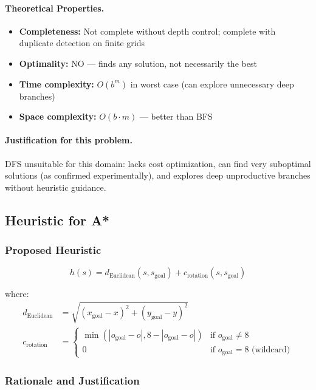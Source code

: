 \documentclass[11pt,a4paper]{article}
\begin{document}
\paragraph{Theoretical Properties.}
\begin{itemize}[leftmargin=1.5cm,itemsep=0.1em]
    \item \textbf{Completeness:} Not complete without depth control; complete with duplicate detection on finite grids
    \item \textbf{Optimality:} NO --- finds any solution, not necessarily the best
    \item \textbf{Time complexity:} $O(b^m)$ in worst case (can explore unnecessary deep branches)
    \item \textbf{Space complexity:} $O(b \cdot m)$ --- better than BFS
\end{itemize}

\paragraph{Justification for this problem.}
DFS unsuitable for this domain: lacks cost optimization, can find very suboptimal solutions (as confirmed experimentally), and explores deep unproductive branches without heuristic guidance.

\subsection{Heuristic for A*}

\subsubsection{Proposed Heuristic}
$$h(s) = d_{\text{Euclidean}}(s, s_{\text{goal}}) + c_{\text{rotation}}(s, s_{\text{goal}})$$

where:
\begin{align*}
d_{\text{Euclidean}} &= \sqrt{(x_{\text{goal}} - x)^2 + (y_{\text{goal}} - y)^2} \\
c_{\text{rotation}} &= \begin{cases}
\min(|o_{\text{goal}} - o|, 8 - |o_{\text{goal}} - o|) & \text{if } o_{\text{goal}} \neq 8 \\
0 & \text{if } o_{\text{goal}} = 8 \text{ (wildcard)}
\end{cases}
\end{align*}

\subsubsection{Rationale and Justification}
\end{document}
